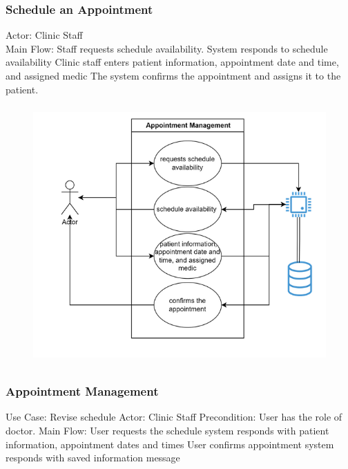 \documentclass{scrreprt}
\begin{document}
	\subsubsection{Schedule an Appointment}
	Actor: Clinic Staff\\
	
	Main Flow:
	Staff requests schedule availability. 
	System responds to schedule availability 
	Clinic staff enters patient information, appointment date and time, and assigned medic
	The system confirms the appointment and assigns it to the patient.
	\begin{figure}[h]
		\begin{center}
			\includegraphics[width=350pt,height=280pt]{usuario3.png}
		\end{center}
		\label{fig:Use case 3}
	\end{figure}
	\pagebreak
	\subsubsection{Appointment Management}
	Use Case: Revise schedule
	Actor: Clinic Staff
	Precondition: User has the role of doctor. 
	Main Flow:
	User requests the schedule
	system responds with patient information, appointment dates and times
	User confirms appointment 
	system responds with saved information message
	
\end{document}
